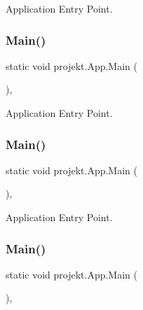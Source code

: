 Application Entry Point. 

\mbox{\label{classprojekt_1_1_app_aa099f0b6d877e4097ec4cbc0f99826ae}} 
\subsubsection{\texorpdfstring{Main()}{Main()}\hspace{0.1cm}{\footnotesize\ttfamily [6/9]}}
{\footnotesize\ttfamily static void projekt.\+App.\+Main (\begin{DoxyParamCaption}{ }\end{DoxyParamCaption})\hspace{0.3cm}{\ttfamily [inline]}, {\ttfamily [static]}}



Application Entry Point. 

\mbox{\label{classprojekt_1_1_app_aa099f0b6d877e4097ec4cbc0f99826ae}} 
\subsubsection{\texorpdfstring{Main()}{Main()}\hspace{0.1cm}{\footnotesize\ttfamily [7/9]}}
{\footnotesize\ttfamily static void projekt.\+App.\+Main (\begin{DoxyParamCaption}{ }\end{DoxyParamCaption})\hspace{0.3cm}{\ttfamily [inline]}, {\ttfamily [static]}}



Application Entry Point. 

\mbox{\label{classprojekt_1_1_app_aa099f0b6d877e4097ec4cbc0f99826ae}} 
\subsubsection{\texorpdfstring{Main()}{Main()}\hspace{0.1cm}{\footnotesize\ttfamily [8/9]}}
{\footnotesize\ttfamily static void projekt.\+App.\+Main (\begin{DoxyParamCaption}{ }\end{DoxyParamCaption})\hspace{0.3cm}{\ttfamily [inline]}, {\ttfamily [static]}}



